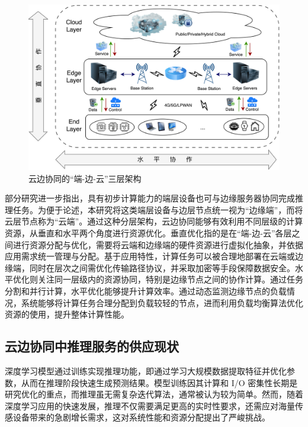 \begin{figure}[ht]
  \centering
  \includegraphics[width=\linewidth]{pics/2-1云边端架构.png}
  \caption{云边协同的“端-边-云”三层架构}
  \label{fig:2-1云边端架构}
\end{figure}

部分研究\cite{lane2016deepx,teerapittayanon2017distributed,liu2023adaptive}进一步指出，具有初步计算能力的端层设备也可与边缘服务器协同完成推理任务。为便于论述，本研究将这类端层设备与边层节点统一视为“边缘端”，而将云层节点称为“云端”。通过这种分层架构，云边协同能够有效利用不同层级的计算资源，从垂直和水平两个角度进行资源优化\cite{dupont2017edge,li2020elastic}。垂直优化指的是在“端-边-云”各层之间进行资源分配与优化，需要将云端和边缘端的硬件资源进行虚拟化抽象，并依据应用需求统一管理与分配。基于应用特性，计算任务可以被合理地部署在云端或边缘端，同时在层次之间需优化传输路径协议，并采取加密等手段保障数据安全。水平优化则关注同一层级内的资源协同，特别是边缘节点之间的协作计算。通过任务分割和并行计算，水平优化能够提升计算效率。通过动态监测边缘节点的负载情况，系统能够将计算任务合理分配到负载较轻的节点，进而利用负载均衡算法优化资源的使用，提升整体计算性能。

\subsection{云边协同中推理服务的供应现状}

深度学习模型通过训练实现推理功能，即通过学习大规模数据提取特征并优化参数，从而在推理阶段快速生成预测结果。模型训练因其计算和 I/O 密集性长期是研究优化的重点，而推理虽无需复杂迭代算法，通常被认为较为简单。然而，随着深度学习应用的快速发展，推理不仅需要满足更高的实时性要求，还需应对海量传感设备带来的急剧增长需求，这对系统性能和资源分配提出了严峻挑战。

